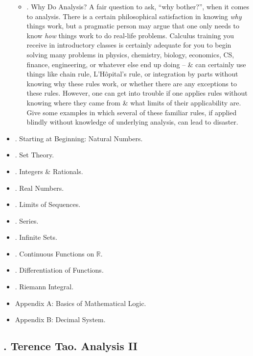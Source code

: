 \documentclass{article}
\begin{document}
\begin{itemize}
\begin{itemize}
		\item {. Why Do Analysis?} A fair question to ask, ``why bother?'', when it comes to analysis. There is a certain philosophical satisfaction in knowing {\it why} things work, but a pragmatic person may argue that one only needs to know {\it how} things work to do real-life problems. Calculus training you receive in introductory classes is certainly adequate for you to begin solving many problems in physics, chemistry, biology, economics, CS, finance, engineering, or whatever else end up doing -- \& can certainly use things like chain rule, L'H\^opital's rule, or integration by parts without knowing why these rules work, or whether there are any exceptions to these rules. However, one can get into trouble if one applies rules without knowing where they came from \& what limits of their applicability are. Give some examples in which several of these familiar rules, if applied blindly without knowledge of underlying analysis, can lead to disaster.
	\end{itemize}
	\item {. Starting at Beginning: Natural Numbers.}
	\item {. Set Theory.}
	\item {. Integers \& Rationals.}
	\item {. Real Numbers.}
	\item {. Limits of Sequences.}
	\item {. Series.}
	\item {. Infinite Sets.}
	\item {. Continuous Functions on $\mathbb{R}$.}
	\item {. Differentiation of Functions.}
	\item {. Riemann Integral.}
	\item {\sf Appendix A: Basics of Mathematical Logic.}
	\item {\sf Appendix B: Decimal System.}
\end{itemize}


\subsection{\cite{Tao_analysis_2}. {\sc Terence Tao}. Analysis II}

\end{document}
